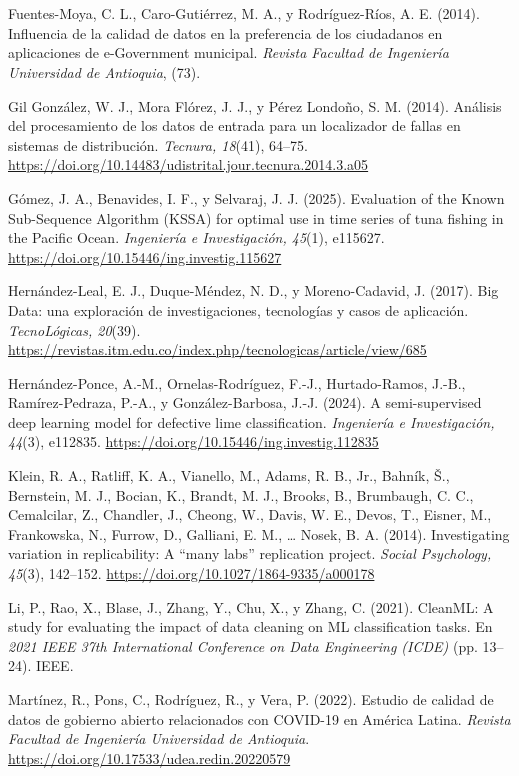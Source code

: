 \documentclass[11pt,openany,oneside,letterpaper]{book}
\makeatletter
\renewenvironment{thebibliography}[1]
  {\chapter*{\bibname}\addcontentsline{toc}{chapter}{\bibname}%
   \def\@biblabel##1{}\list{}{\usecounter{enumiv}\setlength{\leftmargin}{1.27cm}\setlength{\itemindent}{-1.27cm}%
   \setlength{\itemsep}{4pt}\setlength{\parsep}{0pt}}\sloppy}
  {\endlist}
\makeatother
\begin{document}
\begin{thebibliography}{xx}
 Fuentes-Moya, C. L., Caro-Gutiérrez, M. A., y Rodríguez-Ríos, A. E. (2014). Influencia de la calidad de datos en la preferencia de los ciudadanos en aplicaciones de e-Government municipal. \emph{Revista Facultad de Ingeniería Universidad de Antioquia}, (73).

 Gil González, W. J., Mora Flórez, J. J., y Pérez Londoño, S. M. (2014). Análisis del procesamiento de los datos de entrada para un localizador de fallas en sistemas de distribución. \emph{Tecnura, 18}(41), 64--75. \url{https://doi.org/10.14483/udistrital.jour.tecnura.2014.3.a05}

 Gómez, J. A., Benavides, I. F., y Selvaraj, J. J. (2025). Evaluation of the Known Sub-Sequence Algorithm (KSSA) for optimal use in time series of tuna fishing in the Pacific Ocean. \emph{Ingeniería e Investigación, 45}(1), e115627. \url{https://doi.org/10.15446/ing.investig.115627}

 Hernández-Leal, E. J., Duque-Méndez, N. D., y Moreno-Cadavid, J. (2017). Big Data: una exploración de investigaciones, tecnologías y casos de aplicación. \emph{TecnoLógicas, 20}(39). \url{https://revistas.itm.edu.co/index.php/tecnologicas/article/view/685}

 Hernández-Ponce, A.-M., Ornelas-Rodríguez, F.-J., Hurtado-Ramos, J.-B., Ramírez-Pedraza, P.-A., y González-Barbosa, J.-J. (2024). A semi-supervised deep learning model for defective lime classification. \emph{Ingeniería e Investigación, 44}(3), e112835. \url{https://doi.org/10.15446/ing.investig.112835}

 Klein, R. A., Ratliff, K. A., Vianello, M., Adams, R. B., Jr., Bahník, Š., Bernstein, M. J., Bocian, K., Brandt, M. J., Brooks, B., Brumbaugh, C. C., Cemalcilar, Z., Chandler, J., Cheong, W., Davis, W. E., Devos, T., Eisner, M., Frankowska, N., Furrow, D., Galliani, E. M., \ldots{} Nosek, B. A. (2014). Investigating variation in replicability: A ``many labs'' replication project. \emph{Social Psychology, 45}(3), 142--152. \url{https://doi.org/10.1027/1864-9335/a000178}

 Li, P., Rao, X., Blase, J., Zhang, Y., Chu, X., y Zhang, C. (2021). CleanML: A study for evaluating the impact of data cleaning on ML classification tasks. En \emph{2021 IEEE 37th International Conference on Data Engineering (ICDE)} (pp. 13--24). IEEE.

 Martínez, R., Pons, C., Rodríguez, R., y Vera, P. (2022). Estudio de calidad de datos de gobierno abierto relacionados con COVID-19 en América Latina. \emph{Revista Facultad de Ingeniería Universidad de Antioquia}. \url{https://doi.org/10.17533/udea.redin.20220579}


\end{thebibliography}
\end{document}
